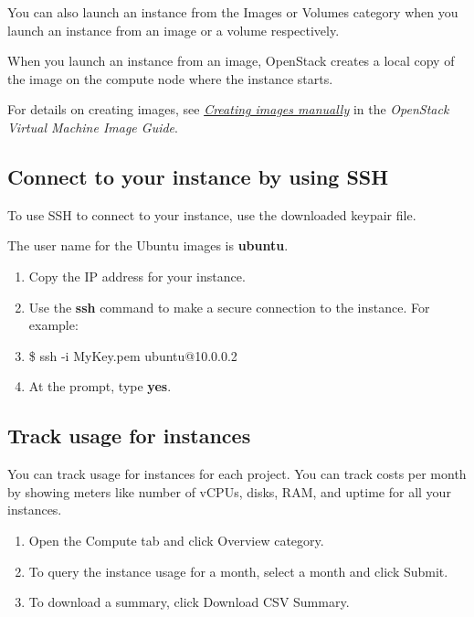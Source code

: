 You can also launch an instance from the Images or Volumes category when
you launch an instance from an image or a volume respectively.

When you launch an instance from an image, OpenStack creates a local
copy of the image on the compute node where the instance starts.

For details on creating images, see
\href{https://docs.openstack.org/image-guide/create-images-manually.html}{\emph{Creating
images manually}} in the \emph{OpenStack Virtual Machine Image Guide}.

\subsection*{Connect to your instance by using SSH}\label{connect-to-your-instance-by-using-ssh}

To use SSH to connect to your instance, use the downloaded keypair file.

 The user name for the Ubuntu images is \textbf{ubuntu}.

\begin{enumerate}
\item Copy the IP address for your instance.
\item Use the \textbf{ssh} command to make a secure connection to the
  instance. For example:
\item \$ ssh -i MyKey.pem ubuntu@10.0.0.2
\item At the prompt, type \textbf{yes}.
\end{enumerate}

\subsection*{Track usage for instances}\label{track-usage-for-instances}

You can track usage for instances for each project. You can track costs
per month by showing meters like number of vCPUs, disks, RAM, and uptime
for all your instances.

\begin{enumerate}
\item Open the Compute tab and click Overview category.
\item To query the instance usage for a month, select a month and click
  Submit.
\item To download a summary, click Download CSV Summary.
\end{enumerate}


